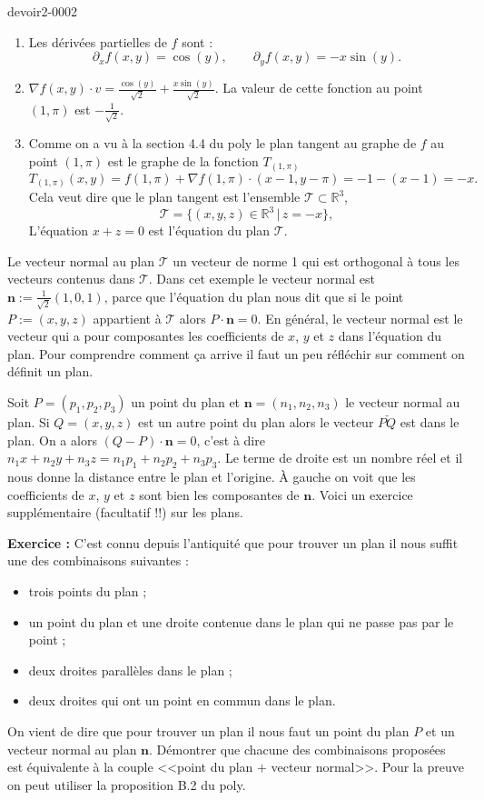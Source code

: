 \begin{corrige}{devoir2-0002}

  \begin{enumerate}
  \item Les dérivées partielles de $f$ sont :
    \[ \partial_x f(x,y)= \cos(y), \qquad \partial_y f (x,y)= -x\sin(y).\]
  \item $\displaystyle \nabla f(x,y)\cdot v= \frac{\cos(y)}{\sqrt{2}}+\frac{x\sin(y)}{\sqrt{2}}.$ La valeur de cette fonction au point $(1,\pi)$  est $-\frac{1}{\sqrt{2}}$.
  \item Comme on a vu à la section 4.4 du poly le plan tangent au graphe de $f$ au point $(1,\pi)$ est le graphe de la fonction $T_{(1,\pi)}$ 
    \[ T_{(1,\pi)}(x,y)= f(1,\pi) + \nabla f(1,\pi)\cdot (x-1, y-\pi)= -1- (x-1)= -x.\]
    Cela veut dire que le plan tangent est l'ensemble $\mathcal{T}\subset\mathbb{R}^3$, 
    \[\mathcal{T}=\{(x,y,z)\in \mathbb{R}^3\, \vert \, z=-x \},\]
    L'équation $x+z=0$ est l'équation du plan $\mathcal{T}$. 
  \end{enumerate}
  Le vecteur normal au plan $\mathcal{T}$ un vecteur de norme 1 qui est orthogonal à tous les vecteurs contenus dans $\mathcal{T}$. Dans cet exemple le vecteur normal est  $\displaystyle \mathbf{n}:=\frac{1}{\sqrt{2}}(1,0,1)$, parce que l'équation du plan nous dit que si le point $P:=(x,y,z)$ appartient à $\mathcal{T}$ alors $P\cdot\mathbf{n}=0$. 
  En général, le vecteur normal est le vecteur qui a pour composantes les coefficients de $x$, $y$ et $z$ dans l'équation du plan. Pour comprendre comment ça arrive il faut un peu réfléchir sur comment on définit un plan. 

  Soit $P=(p_1, p_2, p_3)$ un point du plan et $\mathbf{n}=(n_1, n_2, n_3)$ le vecteur normal au plan. Si $Q= (x,y,z)$ est un autre point du plan alors le vecteur $\bar{PQ}$ est dans le plan. On a alors $(Q-P)\cdot \mathbf{n}=0$, c'est à dire $n_1x+n_2y+n_3z=n_1p_1+n_2p_2+n_3p_3$. Le terme de droite est un nombre réel et il nous donne la distance entre le plan et l'origine. À gauche on voit que les coefficients de $x$, $y$ et $z$ sont bien les composantes de $\mathbf{n}$.  
  Voici un exercice supplémentaire (facultatif !!) sur les plans.  
    
  \textbf{Exercice :} C'est connu depuis l'antiquité que pour trouver un plan il nous suffit une des combinaisons suivantes :
  \begin{itemize}
  \item trois points du plan ;
  \item un point du plan et une droite contenue dans le plan  qui ne passe pas par le point ;
  \item deux droites parallèles dans le plan ;
  \item deux droites qui ont un point en commun dans le plan.
  \end{itemize}
  On vient de dire que pour trouver un plan il nous faut un point du plan $P$ et un vecteur normal au plan  $\mathbf{n}$. Démontrer que chacune des combinaisons proposées est équivalente à la couple <<point du plan $+$ vecteur normal>>. Pour la preuve on peut utiliser la proposition B.2 du poly.    


\end{corrige}
